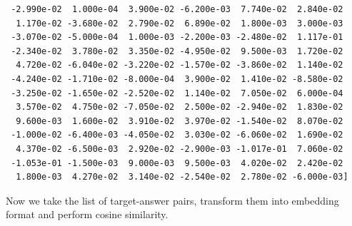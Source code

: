 \documentclass[
  letterpaper,
  DIV=11,
  numbers=noendperiod]{scrreprt}
\begin{document}
\begin{verbatim}
 -2.990e-02  1.000e-04  3.900e-02 -6.200e-03  7.740e-02  2.840e-02
  1.170e-02 -3.680e-02  2.790e-02  6.890e-02  1.800e-03  3.000e-03
 -3.070e-02 -5.000e-04  1.000e-03 -2.200e-03 -2.480e-02  1.117e-01
 -2.340e-02  3.780e-02  3.350e-02 -4.950e-02  9.500e-03  1.720e-02
  4.720e-02 -6.040e-02 -3.220e-02 -1.570e-02 -3.860e-02  1.140e-02
 -4.240e-02 -1.710e-02 -8.000e-04  3.900e-02  1.410e-02 -8.580e-02
 -3.250e-02 -1.650e-02 -2.520e-02  1.140e-02  7.050e-02  6.000e-04
  3.570e-02  4.750e-02 -7.050e-02  2.500e-02 -2.940e-02  1.830e-02
  9.600e-03  1.600e-02  3.910e-02  3.970e-02 -1.540e-02  8.070e-02
 -1.000e-02 -6.400e-03 -4.050e-02  3.030e-02 -6.060e-02  1.690e-02
  4.370e-02 -6.500e-03  2.920e-02 -2.900e-03 -1.017e-01  7.060e-02
 -1.053e-01 -1.500e-03  9.000e-03  9.500e-03  4.020e-02  2.420e-02
  1.800e-03  4.270e-02  3.140e-02 -2.540e-02  2.780e-02 -6.000e-03]
\end{verbatim}

Now we take the list of target-answer pairs, transform them into
embedding format and perform cosine similarity.
\end{document}
